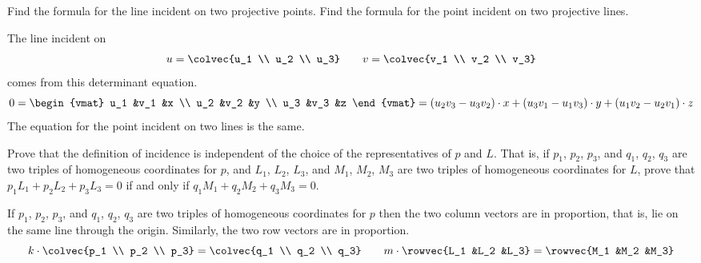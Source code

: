 \begin{exercises}
  \item
    Find the formula for the line incident on two projective points.
    Find the formula for the point incident on two projective lines.
    \begin{answer}
      The line incident on 
      \begin{equation*}
        u=\colvec{u_1 \\ u_2 \\ u_3}
        \qquad
        v=\colvec{v_1 \\ v_2 \\ v_3}
      \end{equation*}
      comes from this determinant equation.
      \begin{equation*}
        0=\begin{vmat}
          u_1  &v_1  &x  \\
          u_2  &v_2  &y  \\
          u_3  &v_3  &z
        \end{vmat}
        =(u_2v_3-u_3v_2)\cdot x 
          + (u_3v_1-u_1v_3)\cdot y 
          + (u_1v_2-u_2v_1)\cdot z
      \end{equation*}
      The equation for the point incident on two lines is the same. 
    \end{answer}
  \item \label{exer:IncidentIndReps}
    Prove that the definition of incidence is independent of the choice of 
    the representatives of $p$ and $L$.
    That is, if $p_1$, $p_2$, $p_3$, and $q_1$, $q_2$, $q_3$ are two triples of
    homogeneous coordinates for $p$, and 
    $L_1$, $L_2$, $L_3$, and $M_1$, $M_2$, $M_3$ are two triples of 
    homogeneous coordinates for $L$, prove that  
    $p_1L_1+p_2L_2+p_3L_3=0$ if and only if 
    $q_1M_1+q_2M_2+q_3M_3=0$. 
    \begin{answer}
      If $p_1$, $p_2$, $p_3$, and $q_1$, $q_2$, $q_3$ are two triples of
      homogeneous coordinates for $p$ then the two column vectors
      are in proportion, that is, lie on the same line through the
      origin.
      Similarly, the two row vectors are in proportion.
      \begin{equation*}
        k\cdot\colvec{p_1 \\ p_2 \\ p_3}
          =\colvec{q_1 \\ q_2 \\ q_3}
        \qquad
        m\cdot\rowvec{L_1 &L_2 &L_3}
          =\rowvec{M_1 &M_2 &M_3}
      \end{equation*}

\end{answer}
\end{exercises}
